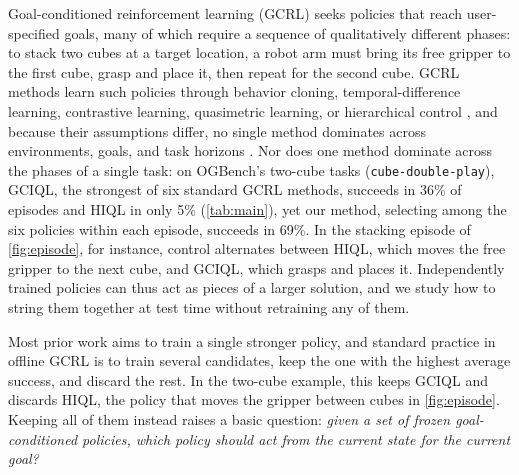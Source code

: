 \documentclass{article}
\theoremstyle{plain}
\theoremstyle{definition}
\theoremstyle{plain}
\begin{document}
Goal-conditioned reinforcement learning (GCRL) seeks policies that reach user-specified goals, many of which require a sequence of qualitatively different phases: to stack two cubes at a target location, a robot arm must bring its free gripper to the first cube, grasp and place it, then repeat for the second cube.
GCRL methods learn such policies through behavior cloning, temporal-difference learning, contrastive learning, quasimetric learning, or hierarchical control \citep{eysenbach2022contrastive,wang2023quasimetric,park2023hiql}, and because their assumptions differ, no single method dominates across environments, goals, and task horizons \citep{park2025ogbench}.
Nor does one method dominate across the phases of a single task: on OGBench's two-cube tasks (\texttt{cube-double-play}), GCIQL, the strongest of six standard GCRL methods, succeeds in 36\% of episodes and HIQL in only 5\% (\cref{tab:main}), yet our method, selecting among the six policies within each episode, succeeds in 69\%.
In the stacking episode of \cref{fig:episode}, for instance, control alternates between HIQL, which moves the free gripper to the next cube, and GCIQL, which grasps and places it.
Independently trained policies can thus act as pieces of a larger solution, and we study how to string them together at test time without retraining any of them.

Most prior work aims to train a single stronger policy, and standard practice in offline GCRL is to train several candidates, keep the one with the highest average success, and discard the rest.
In the two-cube example, this keeps GCIQL and discards HIQL, the policy that moves the gripper between cubes in \cref{fig:episode}.
Keeping all of them instead raises a basic question: \emph{given a set of frozen goal-conditioned policies, which policy should act from the current state for the current goal?}

\end{document}
